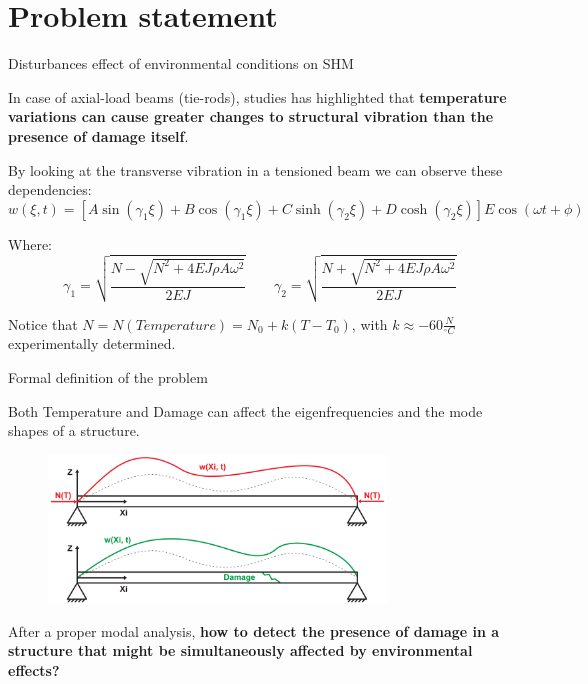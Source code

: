 \section{Problem statement}

\begin{frame}{Disturbances effect of environmental conditions on SHM}

    In case of axial-load beams (tie-rods), studies has highlighted that \textbf{temperature variations can cause greater changes to structural vibration than the presence of damage itself}.

    By looking at the transverse vibration in a tensioned beam we can observe these dependencies:
    \begin{equation}
        w(\xi, t) = \left[ A \sin(\gamma_1 \xi) + B \cos(\gamma_1 \xi) + C \sinh(\gamma_2 \xi) + D \cosh(\gamma_2 \xi)\right] E \cos(\omega t + \phi)
    \end{equation}

    Where:
    \begin{equation}
        \gamma_1 = \sqrt{\frac{N - \sqrt{N^2 + 4EJ \rho A \omega^2}}{2EJ}} \qquad \gamma_2 = \sqrt{\frac{N + \sqrt{N^2 + 4EJ \rho A \omega^2}}{2EJ}}
    \end{equation}

    \vspace{9pt}

    Notice that $N = N(Temperature) = N_0 + k (T - T_0)$, with $k \approx -60 \frac{N}{^\circ C}$ experimentally determined.

\end{frame}



\begin{frame}{Formal definition of the problem}

    Both \textcolor[HTML]{FF0000}{Temperature} and \textcolor[HTML]{00B300}{Damage} can affect the eigenfrequencies and the mode shapes of a structure.

    \begin{figure}
        \centering
        \includegraphics[width=0.8\textwidth]{img/OCAD/tie-rods.pdf}
    \end{figure}

    After a proper modal analysis, \textbf{how to detect the presence of damage in a structure that might be simultaneously affected by environmental effects?}

\end{frame}
